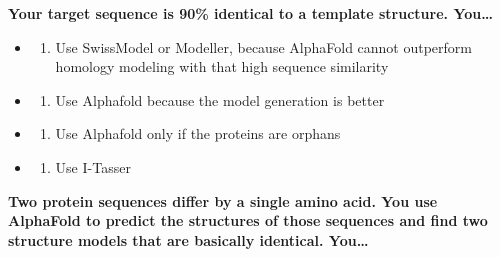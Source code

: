\documentclass[
]{scrbook}
\providecommand{\tightlist}{%
  \setlength{\itemsep}{0pt}\setlength{\parskip}{0pt}}\usepackage{longtable,booktabs,array}
\begin{document}
\textbf{Your target sequence is 90\% identical to a template structure.
You\ldots{} }

\begin{itemize}
\tightlist
\item
  \begin{enumerate}
  \def\labelenumi{(\Alph{enumi})}
  \tightlist
  \item
    Use SwissModel or Modeller, because AlphaFold cannot outperform
    homology modeling with that high sequence similarity\\
  \end{enumerate}
\item
  \begin{enumerate}
  \def\labelenumi{(\Alph{enumi})}
  \setcounter{enumi}{1}
  \tightlist
  \item
    Use Alphafold because the model generation is better\\
  \end{enumerate}
\item
  \begin{enumerate}
  \def\labelenumi{(\Alph{enumi})}
  \setcounter{enumi}{2}
  \tightlist
  \item
    Use Alphafold only if the proteins are orphans\\
  \end{enumerate}
\item
  \begin{enumerate}
  \def\labelenumi{(\Alph{enumi})}
  \setcounter{enumi}{3}
  \tightlist
  \item
    Use I-Tasser
  \end{enumerate}
\end{itemize}

\textbf{Two protein sequences differ by a single amino acid. You use
AlphaFold to predict the structures of those sequences and find two
structure models that are basically identical. You\ldots{} }
\end{document}
